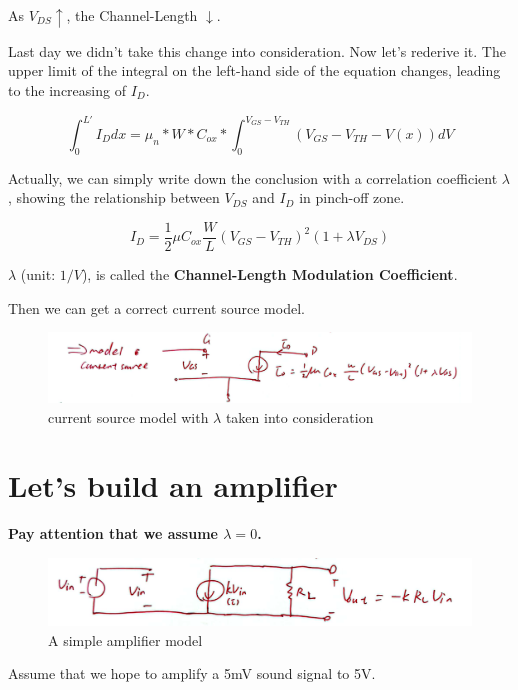 \documentclass[fontset=windows]{article}
\begin{document}
As $V_{DS}\uparrow$, the Channel-Length $\downarrow$. 

Last day we didn't take this change into consideration. Now let's rederive it. 
The upper limit of the integral on the left-hand side of the equation changes, leading to the increasing of $I_D$. 

$$\int_{0}^{L'} I_Ddx=\mu_{n}*W*C_{ox}*\int_{0}^{V_{GS}-V_{TH}} (V_{GS}-V_{TH}-V(x))dV$$

Actually, we can simply write down the conclusion with a correlation coefficient $\lambda$, showing the relationship between $V_{DS}$ and $I_D$ in pinch-off zone. 

$$I_D=\frac{1}{2} \mu C_{ox}\frac{W}{L}(V_{GS}-V_{TH})^2(1+\lambda V_{DS})$$

$\lambda$ (unit: $1/V$), is called the \textbf{Channel-Length Modulation Coefficient}. 

Then we can get a correct current source model. 

\begin{figure}[htbp]
    \centering
    \includegraphics[scale=0.6]{2.jpg}
    \captionsetup{labelformat=empty}
    \caption{current source model with $\lambda$ taken into consideration}
    \label{2}
\end{figure}

\section*{Let's build an amplifier}

\textbf{Pay attention that we assume $\lambda=0$.} 

\begin{figure}[htbp]
    \centering
    \includegraphics[scale=0.6]{3.jpg}
    \captionsetup{labelformat=empty}
    \caption{A simple amplifier model}
    \label{3}
\end{figure}

Assume that we hope to amplify a 5mV sound signal to 5V. 
\end{document}
